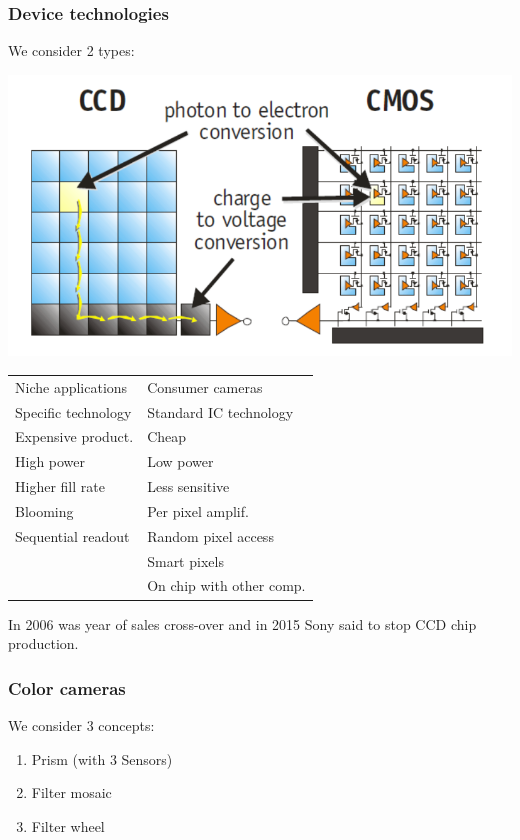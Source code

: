 \documentclass[a4paper, fontsize=8pt, landscape, DIV=1]{scrartcl}
\begin{document}
\begin{multicols*}{4}
		\subsubsection{Device technologies}
		We consider 2 types: 
		\begin{center}
			\includegraphics[width=0.7\columnwidth]{images//ImageAcq/ccd_cmos.png}\\
		\end{center}
		\begin{tabular}{l l}
			\hline 
			\hline
			\thead{CCD} &  \thead{CMOS}  \\ 
			\hline
			Niche applications    & Consumer cameras  \\ 
			Specific technology   & Standard IC technology\\ 
			Expensive product.	  & Cheap \\ 
			High power 			  & Low power \\ 
			Higher fill rate 	  & Less sensitive  \\ 
			Blooming			  & Per pixel amplif. \\ 
			Sequential readout	  & Random pixel access\\ 
								  & Smart pixels \\
								  & On chip with other comp.\\
			\hline 
			\hline
		\end{tabular}
		\par
		In 2006 was year of sales cross-over and in 2015 Sony said to stop CCD chip production.
		
		\vfill\null
		\columnbreak 
		\subsubsection{Color cameras}
		We consider 3 concepts: 
		\begin{enumerate}[noitemsep]
			\item Prism (with 3 Sensors)
			\item Filter mosaic 
			\item Filter wheel 
		\end{enumerate}


\end{multicols*}
\end{document}
